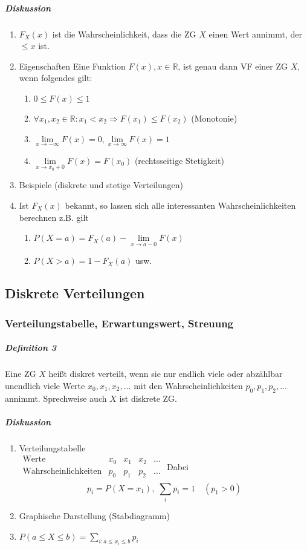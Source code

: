 \documentclass[a4paper]{scrartcl}
\begin{document}
\subparagraph{Diskussion}
\begin{enumerate}
\item $F_X (x)$ ist die Wahrscheinlichkeit, dass die ZG $X$ einen Wert annimmt, der $\leq x$ ist.
\item Eigenschaften Eine Funktion $F(x), x \in \mathbb{R}$, ist genau dann VF einer ZG $X$, wenn folgendes gilt:
\begin{enumerate}
\item $0 \leq F(x) \leq 1$
\item $\forall x_1,x_2 \in \mathbb{R} : x_1 < x_2 \Rightarrow F(x_1) \leq F(x_2) $ (Monotonie)
\item $\lim\limits_{x \to - \infty} F(x) = 0, \lim\limits_{x \to \infty} F(x) = 1$
\item $\lim\limits_{x \to x_0 + 0} F(x) = F(x_0)$ (rechtsseitige Stetigkeit)
\end{enumerate}
\item Beispiele (diskrete und stetige Verteilungen)
\item Ist $F_X (x)$ bekannt, so lassen sich alle interessanten Wahrscheinlichkeiten berechnen z.B. gilt
\begin{enumerate}
\item $P(X = a) = F_X (a) - \lim\limits_{x \to a -0} F(x)$
\item $P (X > a) = 1 - F_X (a)$ usw.
\end{enumerate}
\end{enumerate}

\subsection{Diskrete Verteilungen}
\subsubsection{Verteilungstabelle, Erwartungswert, Streuung}
\subparagraph{Definition 3} Eine ZG $X$ heißt diskret verteilt, wenn sie nur endlich viele oder abzählbar unendlich viele Werte $x_0,x_1,x_2,\dots$ mit den Wahrscheinlichkeiten $p_0,p_1,p_2,\dots$ annimmt. Sprechweise auch $X$ ist diskrete ZG.
\subparagraph{Diskussion}
\begin{enumerate}
\item Verteilungstabelle \\
$\begin{array}{l||c|c|c|c}
\text{Werte} & x_0 & x_1 & x_2 & \dots \\ \hline
\text{Wahrscheinlichkeiten} & p_0 & p_1 & p_2 & \dots \\
\end{array}$
Dabei
\[ p_i = P(X=x_1), \; \sum\limits_i p_i = 1 \quad (p_1 > 0)\]
\item Graphische Darstellung (Stabdiagramm)
\item $P(a \leq X \leq b) = \sum\limits_{i : a \leq x_i \leq b} p_i$
\end{enumerate}
\end{document}
